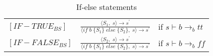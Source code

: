     \bgroup
    \def\arraystretch{3}
    \begin{table}[H]
    \centering
    \begin{tabular}{l c l}
        
        $[IF-TRUE_{BS}]$ & $
        \frac{\langle S_1,\;s\rangle  \rightarrow s^\prime}
        {\langle if\;b\;\{S_1\}\;else\;\{S_2\},\;s\rangle  \rightarrow s^\prime}
        $ & if $s \vdash b \rightarrow_b tt$ \\
        
        $[IF-FALSE_{BS}]$ & $
        \frac{\langle S_2,\;s\rangle  \rightarrow s^\prime}
        {\langle if\;b\;\{S_1\}\;else\;\{S_2\},\;s\rangle  \rightarrow s^\prime}
        $ & if $s \vdash b \rightarrow_b ff$ \\
        
    \end{tabular}
    \caption{If-else statements}
    \label{tab:ifelse}
    \end{table}
    \egroup